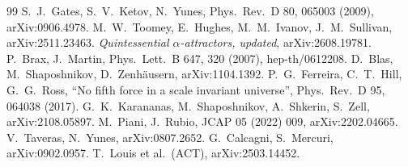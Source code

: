 \documentclass[11pt]{article}
\begin{document}
\begin{thebibliography}{99}
 S.~J.~Gates, S.~V.~Ketov, N.~Yunes, Phys.\ Rev.\ D 80, 065003 (2009), arXiv:0906.4978.
 M.~W.~Toomey, E.~Hughes, M.~M.~Ivanov, J.~M.~Sullivan, arXiv:2511.23463.
 \emph{Quintessential $\alpha$-attractors, updated}, arXiv:2608.19781.
 P.~Brax, J.~Martin, Phys.\ Lett.\ B 647, 320 (2007), hep-th/0612208.
 D.~Blas, M.~Shaposhnikov, D.~Zenh\"ausern, arXiv:1104.1392.
 P.~G.~Ferreira, C.~T.~Hill, G.~G.~Ross, ``No fifth force in a scale invariant universe'',
Phys.\ Rev.\ D 95, 064038 (2017).
 G.~K.~Karananas, M.~Shaposhnikov, A.~Shkerin, S.~Zell, arXiv:2108.05897.
 M.~Piani, J.~Rubio, JCAP 05 (2022) 009, arXiv:2202.04665.
 V.~Taveras, N.~Yunes, arXiv:0807.2652.
 G.~Calcagni, S.~Mercuri, arXiv:0902.0957.
 T.~Louis et al.\ (ACT), arXiv:2503.14452.
\end{thebibliography}
\end{document}
